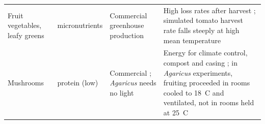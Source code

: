 \begin{table}[H]
\begin{tabular}{p{2.3cm}p{2.6cm}p{5.2cm}p{5.2cm}}
Fruit vegetables, leafy greens & micronutrients & Commercial greenhouse production \cite{cbs2026groenteteelt} & High loss rates after harvest \cite[Fig.~4, p.~9]{fao2019sofa}; simulated tomato harvest rate falls steeply at high mean temperature \cite[Section~5.4, p.~391]{vanthoor2011tomato} \\
Mushrooms & protein (low) & Commercial \cite[Sections~2.1--2.2, pp.~2--3]{goglio2024agaricus}\cite[Section~2.1, p.~2]{robinson2019agaricus}; \textit{Agaricus} needs no light \cite[Abstract]{baars2020agaricus} & Energy for climate control, compost and casing \cite[Table~1, p.~3; Section~3.1, p.~6; Section~4.1, p.~8]{goglio2024agaricus}; in \textit{Agaricus} experiments, fruiting proceeded in rooms cooled to 18~\textdegree{}C and ventilated, not in rooms held at 25~\textdegree{}C \cite[Section~4, p.~10]{baars2020agaricus} \\
\bottomrule
\end{tabular}
\end{table}

